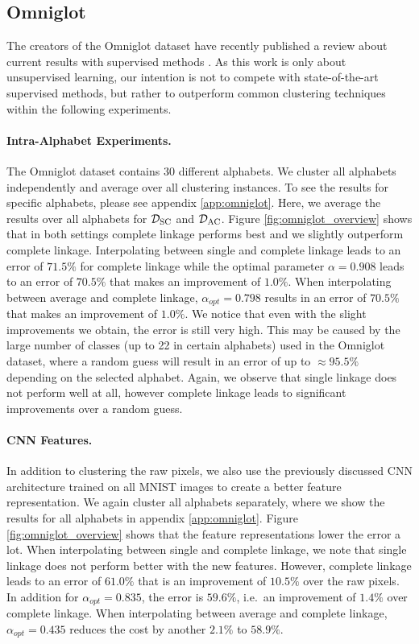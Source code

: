 \subsection{Omniglot}

The creators of the Omniglot dataset have recently published a review about current results with supervised methods \cite{DBLP:journals/corr/abs-1902-03477}. As this work is only about unsupervised learning, our intention is not to compete with state-of-the-art supervised methods, but rather to outperform common clustering techniques within the following experiments.

\paragraph{Intra-Alphabet Experiments.} The Omniglot dataset contains 30 different alphabets. We cluster all alphabets independently and average over all clustering instances. To see the results for specific alphabets, please see appendix \ref{app:omniglot}. Here, we average the results over all alphabets for $\mathcal{D}_\text{SC}$ and $\mathcal{D}_\text{AC}$. Figure \ref{fig:omniglot_overview} shows that in both settings complete linkage performs best and we slightly outperform complete linkage. Interpolating between single and complete linkage leads to an error of $71.5\%$ for complete linkage while the optimal parameter $\alpha = 0.908$ leads to an error of $70.5\%$ that makes an improvement of $1.0\%$. When interpolating between average and complete linkage, $\alpha_{opt} = 0.798$ results in an error of $70.5\%$ that makes an improvement of $1.0\%$. We notice that even with the slight improvements we obtain, the error is still very high. This may be caused by the large number of classes (up to 22 in certain alphabets) used in the Omniglot dataset, where a random guess will result in an error of up to $\approx 95.5\%$ depending on the selected alphabet. Again, we observe that single linkage does not perform well at all, however complete linkage leads to significant improvements over a random guess.

\paragraph{CNN Features.} In addition to clustering the raw pixels, we also use the previously discussed CNN architecture trained on all MNIST images to create a better feature representation. We again cluster all alphabets separately, where we show the results for all alphabets in appendix \ref{app:omniglot}. Figure \ref{fig:omniglot_overview} shows that the feature representations lower the error a lot. When interpolating between single and complete linkage, we note that single linkage does not perform better with the new features. However, complete linkage leads to an error of $61.0\%$ that is an improvement of $10.5\%$ over the raw pixels. In addition for $\alpha_{opt} = 0.835$, the error is $59.6\%$, i.e.\ an improvement of $1.4\%$ over complete linkage. When interpolating between average and complete linkage, $\alpha_{opt} = 0.435$ reduces the cost by another $2.1\%$ to $58.9\%$.

